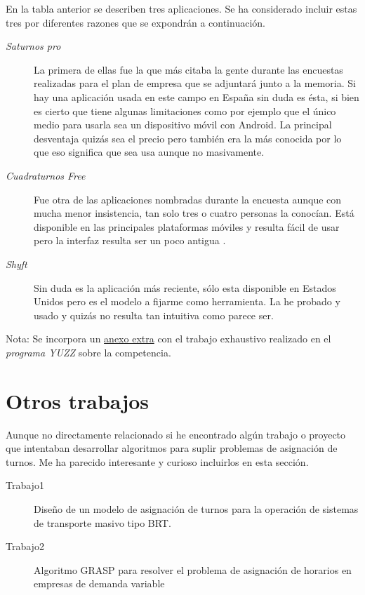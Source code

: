 En la tabla anterior  se describen tres aplicaciones. Se ha considerado incluir estas tres  por diferentes razones que se expondrán a continuación.

\begin{description}
	\item[\emph{Saturnos pro}] La primera de ellas fue la que más citaba la gente durante las encuestas realizadas para el plan de empresa que se adjuntará junto a la memoria. Si hay una aplicación usada en este campo en España sin duda es ésta, si bien es cierto que tiene algunas limitaciones como por ejemplo que el único medio para usarla sea un dispositivo móvil con Android. La principal desventaja quizás sea el precio pero también era la más conocida por lo que eso significa que sea usa aunque no masivamente.
	\item[\emph{Cuadraturnos Free}] Fue otra de las aplicaciones nombradas durante la encuesta aunque con mucha menor insistencia, tan solo tres o cuatro personas la conocían. Está disponible en las principales plataformas móviles y resulta fácil de usar pero la interfaz resulta ser un poco antigua .
	\item[\emph{Shyft}] Sin duda es la aplicación más reciente, sólo esta disponible en Estados Unidos pero es el modelo a fijarme como herramienta. La he probado y usado y quizás no resulta tan intuitiva como parece ser.
\end{description}

Nota: Se incorpora un \underline{anexo extra} con el trabajo exhaustivo realizado en el \emph{programa YUZZ } sobre la competencia. 

\section{Otros trabajos}
Aunque no directamente relacionado si he encontrado algún trabajo o proyecto que intentaban desarrollar algoritmos para suplir problemas de asignación de turnos. Me ha parecido interesante y curioso incluirlos en esta sección.

    \begin{description}
	\item[Trabajo1] Diseño de un modelo de asignación de turnos para la operación
de sistemas de transporte masivo tipo BRT.\cite{trabajo1}
	\item[Trabajo2]Algoritmo GRASP \citep{grasp} para resolver el problema de asignación de horarios en empresas de demanda variable \citep{trabajo2}
\end{description}
